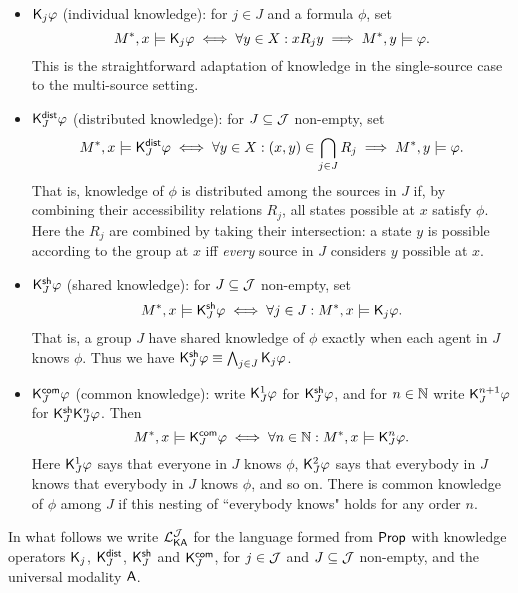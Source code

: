 \begin{itemize}
\item $\mathsf{K}_j\varphi$ (individual knowledge): for $j \in J$ and a formula
$\phi$, set
    \[
    M^*, x \models \mathsf{K}_j\varphi
\iff
\forall y \in X: x{R_j}y \implies M^*, y \models \varphi.\]
    This is the straightforward adaptation of knowledge in the single-source case
to the multi-source setting.

    \item $\mathsf{K}^{\mathsf{dist}}_J\varphi$ (distributed knowledge): for $J \subseteq \mathcal{J}$
non-empty, set
    \[
    M^*, x \models \mathsf{K}^{\mathsf{dist}}_J\varphi
\iff
\forall y \in X: (x, y) \in \bigcap_{j \in J}{R_j}
    \implies M^*, y \models \varphi.\]
    That is, knowledge of $\phi$ is distributed among the sources in
$J$ if, by combining their accessibility relations $R_j$, all
states possible at $x$ satisfy $\phi$. Here the $R_j$ are
combined by taking their intersection: a state $y$ is possible
according to the group at $x$ iff \emph{every} source in $J$ considers
$y$ possible at $x$.

    \item $\mathsf{K}^{\mathsf{sh}}_J\varphi$ (shared knowledge):\footnotemark{} for $J \subseteq
      \mathcal{J}$ non-empty, set
    \[
    M^*, x \models \mathsf{K}^{\mathsf{sh}}_J\varphi
\iff
\forall j \in J: M^*, x \models \mathsf{K}_j\varphi.\]
    That is, a group $J$ have shared knowledge of $\phi$ exactly when
each agent in $J$ knows $\phi$. Thus we have
$\mathsf{K}^{\mathsf{sh}}_J\varphi \equiv \bigwedge_{j \in J}\mathsf{K}_j\varphi$.


    \item $\mathsf{K}^{\mathsf{com}}_J\varphi$ (common knowledge): write $\mathsf{K}_J^1\varphi$ for
$\mathsf{K}^{\mathsf{sh}}_J\varphi$, and for $n \in \mathbb{N}$ write $\mathsf{K}_J^{n +
1}\varphi$ for $\mathsf{K}^{\mathsf{sh}}_J\mathsf{K}_J^n\varphi$. Then
    \[
    M^*, x \models \mathsf{K}^{\mathsf{com}}_J\varphi
\iff
\forall n \in \mathbb{N}: M^*, x \models \mathsf{K}_J^n\varphi.\]
    Here $\mathsf{K}_J^1\varphi$ says that everyone in $J$ knows $\phi$,
$\mathsf{K}_J^2\varphi$ says that everybody in $J$ knows that everybody in
$J$ knows $\phi$, and so on. There is common knowledge of
$\phi$ among $J$ if this nesting of ``everybody knows" holds for
any order $n$.

    \end{itemize}

In what follows we write $\mathcal{L}_{\mathsf{K}\mathsf{A}}^{\mathcal{J}}$ for the language formed from $\mathsf{Prop}$ with
knowledge operators $\mathsf{K}_j$, $\mathsf{K}^{\mathsf{dist}}_J$, $\mathsf{K}^{\mathsf{sh}}_J$ and $\mathsf{K}^{\mathsf{com}}_J$, for $j
\in \mathcal{J}$ and $J \subseteq \mathcal{J}$ non-empty, and the universal modality $\mathsf{A}$.

